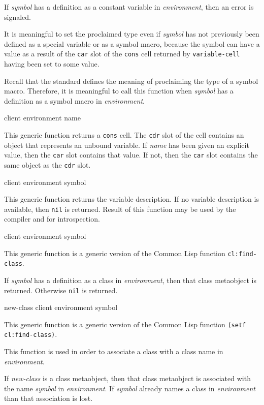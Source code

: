If \textit{symbol} has a definition as a constant variable in
\textit{environment}, then an error is signaled.

It is meaningful to set the proclaimed type even if \textit{symbol}
has not previously been defined as a special variable or as a symbol
macro, because the symbol can have a value as a result of the
\texttt{car} slot of the \texttt{cons} cell returned by
\texttt{variable-cell} having been set to some value.

Recall that the \commonlisp{} standard defines the meaning of
proclaiming the type of a symbol macro.  Therefore, it is meaningful
to call this function when \textit{symbol} has a definition as a
symbol macro in \textit{environment}.

 {client environment name}

This generic function returns a \texttt{cons} cell.  The \texttt{cdr}
slot of the cell contains an object that represents an unbound
variable.  If \textit{name} has been given an explicit value, then the
\texttt{car} slot contains that value.  If not, then the \texttt{car}
slot contains the same object as the \texttt{cdr} slot.

 {client environment symbol}

This generic function returns the variable description. If no variable
description is available, then \texttt{nil} is returned. Result of this
function may be used by the compiler and for introspection.

 {client environment symbol}

This generic function is a generic version of the Common Lisp function
\texttt{cl:find-class}.

If \textit{symbol} has a definition as a class in
\textit{environment}, then that class metaobject is returned.
Otherwise \texttt{nil} is returned.

 {new-class client environment symbol}

This generic function is a generic version of the Common Lisp function
\texttt{(setf cl:find-class)}.

This function is used in order to associate a class with a class name
in \textit{environment}.

If \textit{new-class} is a class metaobject, then that class
metaobject is associated with the name \textit{symbol} in
\textit{environment}.  If \textit{symbol} already names a class in
\textit{environment} than that association is lost.

